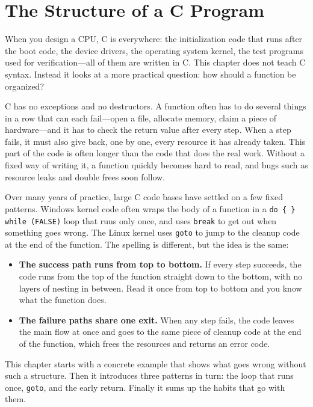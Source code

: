 \chapter{The Structure of a C Program}
\label{chap:c-structure}

When you design a CPU, C is everywhere: the initialization code that runs after the boot code, the device drivers, the operating system kernel, the test programs used for verification---all of them are written in C. This chapter does not teach C syntax. Instead it looks at a more practical question: how should a function be organized?

C has no exceptions and no destructors. A function often has to do several things in a row that can each fail---open a file, allocate memory, claim a piece of hardware---and it has to check the return value after every step. When a step fails, it must also give back, one by one, every resource it has already taken. This part of the code is often longer than the code that does the real work. Without a fixed way of writing it, a function quickly becomes hard to read, and bugs such as resource leaks and double frees soon follow.

Over many years of practice, large C code bases have settled on a few fixed patterns. Windows kernel code often wraps the body of a function in a \texttt{do \{ \} while (FALSE)} loop that runs only once, and uses \texttt{break} to get out when something goes wrong. The Linux kernel uses \texttt{goto} to jump to the cleanup code at the end of the function. The spelling is different, but the idea is the same:
\begin{itemize}
  \item \textbf{The success path runs from top to bottom.} If every step succeeds, the code runs from the top of the function straight down to the bottom, with no layers of nesting in between. Read it once from top to bottom and you know what the function does.
  \item \textbf{The failure paths share one exit.} When any step fails, the code leaves the main flow at once and goes to the same piece of cleanup code at the end of the function, which frees the resources and returns an error code.
\end{itemize}

This chapter starts with a concrete example that shows what goes wrong without such a structure. Then it introduces three patterns in turn: the loop that runs once, \texttt{goto}, and the early return. Finally it sums up the habits that go with them.


